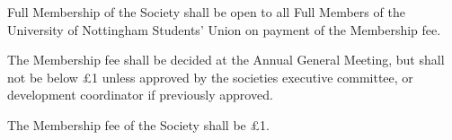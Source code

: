 \begin{clause}  
  Full Membership of the Society shall be open to all Full Members of the University of Nottingham Students' Union on payment of the Membership fee.
\end{clause}

\begin{subclause}
  The Membership fee shall be decided at the Annual General Meeting, but shall not be below \pounds 1 unless approved by the societies executive committee, or development coordinator if previously approved.
\end{subclause}

\begin{subclause}  
  The Membership fee of the Society shall be \pounds 1.
\end{subclause}
